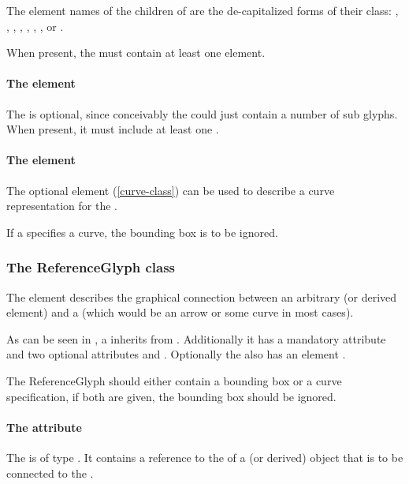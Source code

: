 The element names of the children of \ListOfSubGlyphs are the de-capitalized forms of their class: , , , , , , , or .

When present, the  must contain at least one element. 

\paragraph {The  element}
\label{listofreferenceglyphs-class}
The \ListOfReferenceGlyphs is optional, since conceivably the 
\GeneralGlyph could just contain a number of sub glyphs. When present, 
it must include at least one \ReferenceGlyph. 


\paragraph {The  element}
The optional \Curve element (\ref{curve-class}) can be used to describe 
a curve representation for the \GeneralGlyph. 

If a \GeneralGlyph specifies a curve, the bounding box is to be ignored. 

\subsubsection{The ReferenceGlyph class}
\label{referenceglyph-class}
The  element describes the graphical connection 
between an arbitrary \GraphicalObject (or derived element) and a 
\GeneralGlyph (which would be an arrow or some curve in most cases). 

As can be seen in , a \ReferenceGlyph 
inherits from \GraphicalObject. Additionally it has a mandatory 
attribute  and two optional attributes  
and . Optionally the \ReferenceGlyph also has an element 
. 

The ReferenceGlyph should either contain a bounding box or a curve 
specification, if both are given, the bounding box should be ignored. 

\paragraph{The  attribute}
The  is of type . It contains a reference 
to the  of a \GraphicalObject (or derived) object that is to 
be connected to the \GeneralGlyph. 

